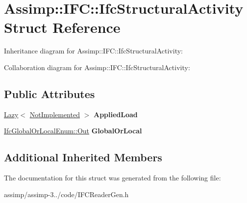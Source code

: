 \hypertarget{struct_assimp_1_1_i_f_c_1_1_ifc_structural_activity}{\section{Assimp\+:\+:I\+F\+C\+:\+:Ifc\+Structural\+Activity Struct Reference}
\label{struct_assimp_1_1_i_f_c_1_1_ifc_structural_activity}
}


Inheritance diagram for Assimp\+:\+:I\+F\+C\+:\+:Ifc\+Structural\+Activity\+:


Collaboration diagram for Assimp\+:\+:I\+F\+C\+:\+:Ifc\+Structural\+Activity\+:
\subsection*{Public Attributes}
\begin{DoxyCompactItemize}
\item 
\hypertarget{struct_assimp_1_1_i_f_c_1_1_ifc_structural_activity_a14d6607369ac4c3f1d43d10354bde414}{\hyperlink{struct_assimp_1_1_s_t_e_p_1_1_lazy}{Lazy}$<$ \hyperlink{struct_assimp_1_1_i_f_c_1_1_not_implemented}{Not\+Implemented} $>$ {\bfseries Applied\+Load}}\label{struct_assimp_1_1_i_f_c_1_1_ifc_structural_activity_a14d6607369ac4c3f1d43d10354bde414}

\item 
\hypertarget{struct_assimp_1_1_i_f_c_1_1_ifc_structural_activity_a8cd3297914e23866f53e2bc41c3f370c}{\hyperlink{classboost_1_1shared__ptr}{Ifc\+Global\+Or\+Local\+Enum\+::\+Out} {\bfseries Global\+Or\+Local}}\label{struct_assimp_1_1_i_f_c_1_1_ifc_structural_activity_a8cd3297914e23866f53e2bc41c3f370c}

\end{DoxyCompactItemize}
\subsection*{Additional Inherited Members}


The documentation for this struct was generated from the following file\+:\begin{DoxyCompactItemize}
\item 
assimp/assimp-\/3../code/I\+F\+C\+Reader\+Gen.\+h\end{DoxyCompactItemize}
